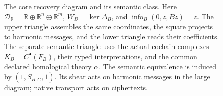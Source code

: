 \begin{figure}[htbp]
\centering
{}

\medskip
{}
\caption{The core recovery diagram and its semantic class.
Here \(\mathcal D_{\mathbb R}=\mathbb R\oplus\mathbb R^n\oplus\mathbb R^m\),
\(W_B=\ker\Delta_B\), and \(\operatorname{info}_B(0,z,Bz)=z\).
The upper triangle assembles the same coordinates, the square projects to
harmonic messages, and the lower triangle reads their coefficients.
The separate semantic triangle uses the actual cochain complexes
\(K_B=C^\bullet(F_B)\), their typed interpretations, and the common declared
homological theory \(\alpha\). The semantic equivalence is induced by
\((1,S_{B,C},1)\). Its shear acts on harmonic messages in the
large diagram; native transport acts on ciphertexts.}
\label{fig:coupled-core-diagrams}
\end{figure}
